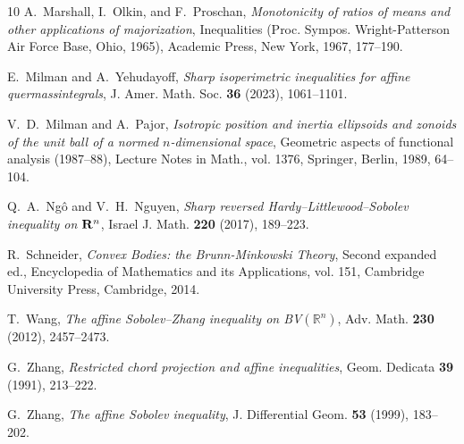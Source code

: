 \documentclass{amsart}
\newcommand{\R}{\mathbb R}
\begin{document}
\begin{thebibliography}{10}
A.~Marshall, I.~Olkin, and F.~Proschan, {\em Monotonicity of ratios of means and other applications of majorization}, Inequalities ({P}roc. {S}ympos. {W}right-{P}atterson {A}ir {F}orce {B}ase, {O}hio, 1965), Academic Press, New York, 1967, 177--190.

E.~Milman and A.~Yehudayoff, {\em Sharp isoperimetric inequalities for affine quermassintegrals}, J. Amer. Math. Soc. {\bf 36} (2023), 1061--1101.

V.~D.~Milman and A.~Pajor, {\em Isotropic position and inertia ellipsoids and zonoids of the unit ball of a normed {$n$}-dimensional space}, Geometric aspects of functional analysis (1987--88), Lecture Notes in Math., vol. 1376, Springer, Berlin, 1989, 64--104.

Q.~A.~Ng\^{o} and V.~H.~Nguyen,  {\em Sharp reversed {H}ardy--{L}ittlewood--{S}obolev inequality on {${\bf R}^n$}}, Israel J. Math. {\bf 220} (2017), 189--223.

R.~Schneider, {\em Convex {B}odies: the {B}runn-{M}inkowski {T}heory}, {S}econd expanded ed., Encyclopedia of Mathe\-matics and its Applications, vol. 151, Cambridge University Press, Cambridge, 2014.
  
T.~Wang, {\em The affine {S}obolev--{Z}hang inequality on {BV}$({\R}^n)$}, Adv.  Math. {\bf 230} (2012), 2457--2473.
  
G.~Zhang, {\em Restricted chord projection and affine inequalities}, Geom. Dedicata {\bf 39} (1991), 213--222.

G.~Zhang, {\em The affine {S}obolev inequality}, J. Differential Geom. {\bf 53} (1999), 183--202.

\end{thebibliography}
\end{document}
